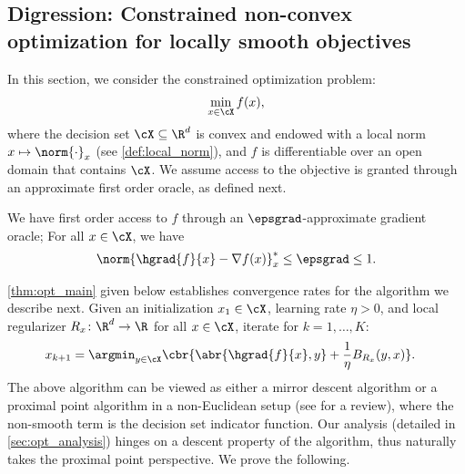 \subsection{Digression: Constrained non-convex optimization for locally smooth objectives}
\label{sec:opt_main}
In this section, we consider the constrained optimization problem:
\begin{align}\label{opt:objective}
	\min_{x\in \cX} f(x),
\end{align}
where the decision set $\cX\subseteq \R^d$ is convex and endowed with a local norm $x \mapsto \norm{\cdot}_x$ (see \cref{def:local_norm}), and $f$ is differentiable over an open domain that contains $\cX$. We assume access to the objective is granted through an approximate first order oracle, as defined next.
\begin{assumption}\label{assm:opt_grad_oracle}
We have first order access to $f$ through an $\epsgrad$-approximate gradient oracle; For all $x\in \cX$, we have \begin{align*}
\norm{\hgrad{f}{x} - \nabla f(x)}_x^* \leq \epsgrad \leq 1.
\end{align*}
\end{assumption}
\cref{thm:opt_main} given below establishes convergence rates for the algorithm we describe next.
Given an initialization $x_1\in \cX$, learning rate $\eta > 0$, and local regularizer $R_x\colon \R^d \to \R$ for all $x\in \cX$, iterate for $k=1, \ldots, K:$
\begin{align}\label{eq:alg_opt_omd}
    &x_{k+1} = \argmin_{y\in \cX} 
    		\cbr{\abr{\hgrad{f}{x}, y} + \frac1\eta B_{R_x}(y, x)} .
\end{align}
The above algorithm can be viewed as either a mirror descent algorithm \citep{nemirovskij1983problem,beck2003mirror}  or a proximal point algorithm \citep{rockafellar1976monotone} in a non-Euclidean setup (see \citealp{teboulle2018simplified} for a review), where the non-smooth term is the decision set indicator function.
Our analysis (detailed in \cref{sec:opt_analysis}) hinges on a descent property of the algorithm, thus naturally takes the proximal point perspective. We prove the following.
